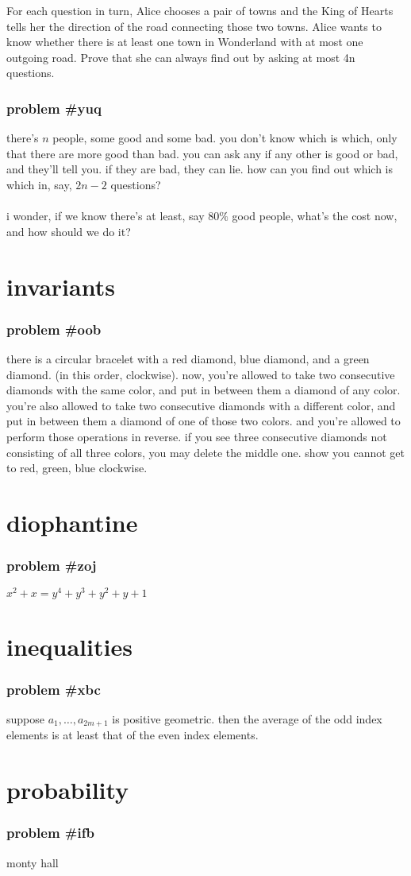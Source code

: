 \documentclass{article}
\newcommand{\problem}[1]{\subsubsection*{\textbf{problem \##1}}}
\newcommand{\chapter}[1]{\section*{#1}}
\begin{document}
For each question in turn, Alice chooses a pair of towns and the King of Hearts tells her the
direction of the road connecting those two towns.
Alice wants to know whether there is at least one town in Wonderland with at most one
outgoing road. Prove that she can always find out by asking at most 4n questions.
\problem{yuq} there's $n$ people, some good and some bad. you don't know which is which, only that there are more good than bad. you can ask any if any other is good or bad, and they'll tell you. if they are bad, they can lie. how can you find out which is which in, say, $2n-2$ questions?\\\\
i wonder, if we know there's at least, say $80\%$ good people, what's the cost now, and how should we do it?
\chapter{invariants}
\problem{oob} there is a circular bracelet with a red diamond, blue diamond, and a green diamond. (in this order, clockwise). now, you're allowed to take two consecutive diamonds with the same color, and put in between them a diamond of any color. you're also allowed to take two consecutive diamonds with a different color, and put in between them a diamond of one of those two colors. and you're allowed to perform those operations in reverse. if you see three consecutive diamonds not consisting of all three colors, you may delete the middle one. show you cannot get to red, green, blue clockwise.
\chapter{diophantine}
\problem{zoj} $x^2+x=y^4+y^3+y^2+y+1$
\chapter{inequalities}
\problem{xbc} suppose $a_1,\dots,a_{2m+1}$ is positive geometric. then the average of the odd index elements is at least that of the even index elements.
\chapter{probability}
\problem{ifb} monty hall
\end{document}
